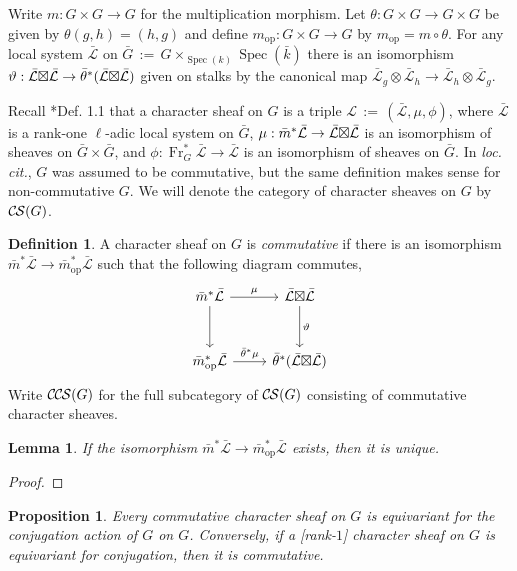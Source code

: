 \documentclass[10pt]{amsart}
\theoremstyle{plain}
\newtheorem{proposition}[theorem]{Proposition}
\newtheorem{lemma}[theorem]{Lemma}
\theoremstyle{definition}
\newtheorem{definition}[theorem]{Definition}
\newcommand{\bFq}{\bar{k}}
\newcommand{\Fq}{k}
\newcommand{\Frob}[1]{\operatorname{Fr}_{#1}}
\newcommand{\Spec}[1]{{\operatorname{Spec}(#1)}}
\newcommand{\op}{_{\operatorname{op}}}
\newcommand{\ceq}{{\, :=\, }}
\newcommand{\cs}[1]{{\mathcal{#1}}}
\newcommand{\gcs}[1]{{\mathcal{\bar #1}}}
\newcommand{\CS}{{\mathcal{C\hskip-0.8pt S}}}
\newcommand{\CCS}{{\mathcal{C\hskip-.8pt C\hskip-0.8pt S}}}
\newcommand{\bm}{\bar{m}}
\newcommand{\bG}{\bar{G}}
\newcommand{\tight}[3]{\hspace{-#1pt}{#2}\hspace{-#3pt}}
\newcommand{\LxL}{\text{$\gcs{L} \tight{0}{\boxtimes}{0} \gcs{L}$}}
\begin{document}
Write $m : G \times G \to G$ for the multiplication morphism.
Let $\theta : G\times G \to G\times G$ be given by $\theta(g,h) = (h,g)$
and define $m\op : G \times G \to G$ by $m\op = m \circ \theta$.
For any local system $\gcs{L}$ on $\bG \ceq G \times_{\Spec{\Fq}} \Spec{\bFq}$ there is an isomorphism
$\vartheta : \LxL \to {\bar \theta}^*(\LxL)$ given on stalks by the canonical map
$\gcs{L}_{g} \otimes \gcs{L}_{h} \to \gcs{L}_{h} \otimes \gcs{L}_{g}$.

Recall \cite{cunningham-roe:13a}*{Def. 1.1} that a character sheaf on $G$ is a triple $\cs{L} \ceq (\gcs{L}, \mu, \phi)$,
where $\gcs{L}$ is a rank-one $\ell$-adic local system on $\bG$, $\mu : \bm^* \gcs{L} \to \LxL$ is an isomorphism
of sheaves on $\bG \times \bG$, and $\phi : \Frob{G}^* \gcs{L} \to \gcs{L}$ is an isomorphism of sheaves on $\bG$.
In \emph{loc. cit.}, $G$ was assumed to be commutative, but the same definition makes sense for non-commutative $G$.
We will denote the category of character sheaves on $G$ by $\CS(G)$.

\begin{definition}\label{def:CCS}
A character sheaf on $G$ is \emph{commutative} if there is an isomorphism ${\bar m}^* \gcs{L} \to {\bar m}\op^* \gcs{L}$
such that the following diagram commutes,
  \[
  \begin{tikzcd}[row sep=30]
   \bm^*\gcs{L} \arrow{d} \arrow{r}{\mu} & \LxL \arrow{d}{\vartheta}\\
   \bm\op^*\gcs{L} \arrow{r}{{\bar \theta}^*\mu} &  {\bar \theta}^*(\LxL)
  \end{tikzcd}
  \]
 Write $\CCS(G)$ for the full subcategory of $\CS(G)$ consisting of commutative character sheaves.
 \end{definition}
 

\begin{lemma}
If the isomorphism ${\bar m}^* \gcs{L} \to {\bar m}\op^* \gcs{L}$ exists, then it is unique.
\end{lemma}
\begin{proof}
\end{proof}

\begin{proposition}
Every commutative character sheaf on $G$ is equivariant for the conjugation action of $G$ on $G$. Conversely, if a [rank-$1$] character sheaf on $G$ is equivariant for conjugation, then it is commutative. 
\end{proposition}
\end{document}
